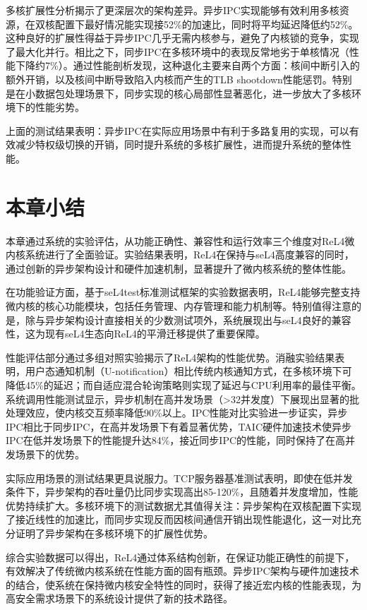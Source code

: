 多核扩展性分析揭示了更深层次的架构差异。异步IPC实现能够有效利用多核资源，在双核配置下最好情况能实现接52\%的加速比，同时将平均延迟降低约52\%。这种良好的扩展性得益于异步IPC几乎无需内核参与，避免了内核锁的竞争，实现了最大化并行。相比之下，同步IPC在多核环境中的表现反常地劣于单核情况（性能下降约7\%）。通过性能剖析发现，这种退化主要来自两个方面：核间中断引入的额外开销，以及核间中断导致陷入内核而产生的TLB shootdown性能惩罚。特别是在小数据包处理场景下，同步实现的核心局部性显著恶化，进一步放大了多核环境下的性能劣势。

上面的测试结果表明：异步IPC在实际应用场景中有利于多路复用的实现，可以有效减少特权级切换的开销，同时提升系统的多核扩展性，进而提升系统的整体性能。

\section{本章小结}
本章通过系统的实验评估，从功能正确性、兼容性和运行效率三个维度对ReL4微内核系统进行了全面验证。实验结果表明，ReL4在保持与seL4高度兼容的同时，通过创新的异步架构设计和硬件加速机制，显著提升了微内核系统的整体性能。

在功能验证方面，基于seL4test标准测试框架的实验数据表明，ReL4能够完整支持微内核的核心功能模块，包括任务管理、内存管理和能力机制等。特别值得注意的是，除与异步架构设计直接相关的少数测试项外，系统展现出与seL4良好的兼容性，这为现有seL4生态向ReL4的平滑迁移提供了重要保障。

性能评估部分通过多组对照实验揭示了ReL4架构的性能优势。消融实验结果表明，用户态通知机制（U-notification）相比传统内核通知方式，在多核环境下可降低45\%的延迟；而自适应混合轮询策略则实现了延迟与CPU利用率的最佳平衡。系统调用性能测试显示，异步机制在高并发场景（>32并发度）下展现出显著的批处理效应，使内核交互频率降低90\%以上。IPC性能对比实验进一步证实，异步IPC相比于同步IPC，在高并发场景下有着显著优势，TAIC硬件加速技术使异步IPC在低并发场景下的性能提升达84\%，接近同步IPC的性能，同时保持了在高并发场景下的优势。

实际应用场景的测试结果更具说服力。TCP服务器基准测试表明，即使在低并发条件下，异步架构的吞吐量仍比同步实现高出85-120\%，且随着并发度增加，性能优势持续扩大。多核环境下的测试数据尤其值得关注：异步架构在双核配置下实现了接近线性的加速比，而同步实现反而因核间通信开销出现性能退化，这一对比充分证明了异步架构在多核环境下的扩展性优势。

综合实验数据可以得出，ReL4通过体系结构创新，在保证功能正确性的前提下，有效解决了传统微内核系统在性能方面的固有瓶颈。异步IPC架构与硬件加速技术的结合，使系统在保持微内核安全特性的同时，获得了接近宏内核的性能表现，为高安全需求场景下的系统设计提供了新的技术路径。